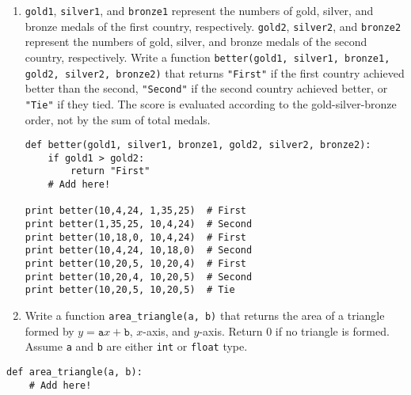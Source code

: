 \documentclass[../main.tex]{subfiles}
\begin{document}
\begin{enumerate}
\item \texttt{gold1}, \texttt{silver1}, and \texttt{bronze1} represent the numbers of gold, silver, and bronze medals of the first country, respectively.
\texttt{gold2}, \texttt{silver2}, and \texttt{bronze2} represent the numbers of gold, silver, and bronze medals of the second country, respectively.
Write a function \texttt{better(gold1, silver1, bronze1, gold2, silver2, bronze2)} that returns \texttt{"First"} if the first country achieved better than the second, \texttt{"Second"} if the second country achieved better, or \texttt{"Tie"} if they tied.
The score is evaluated according to the gold-silver-bronze order, not by the sum of total medals. 
\begin{verbatim}
def better(gold1, silver1, bronze1, gold2, silver2, bronze2):
	if gold1 > gold2:
		return "First"
	# Add here!
	
print better(10,4,24, 1,35,25)  # First
print better(1,35,25, 10,4,24)  # Second
print better(10,18,0, 10,4,24)  # First
print better(10,4,24, 10,18,0)  # Second
print better(10,20,5, 10,20,4)  # First
print better(10,20,4, 10,20,5)  # Second
print better(10,20,5, 10,20,5)  # Tie
\end{verbatim}

\item Write a function \texttt{area\_triangle(a, b)} that returns the area of a triangle formed by $y = \texttt{a}x + \texttt{b}$, $x$-axis, and $y$-axis. Return 0 if no triangle is formed. Assume \texttt{a} and \texttt{b} are either \texttt{int} or \texttt{float} type.
\end{enumerate}
\begin{verbatim}
def area_triangle(a, b):
	# Add here!
	
\end{verbatim}
\end{document}
